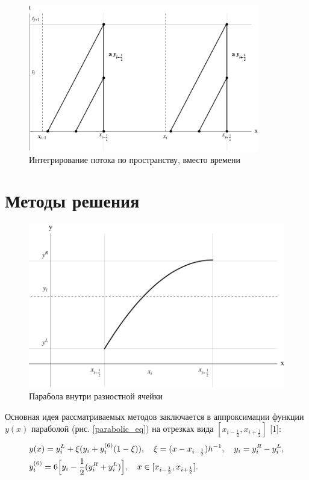 \documentclass[12pt,a4paper]{article}
\newcommand{\picref}[1]{рис. \ref{#1}}
\newcommand{\half}{\frac{1}{2}}
\begin{document}
    \begin{figure}[h]
        \centering
        \includegraphics[width=0.897\textwidth]{flow_visual.pdf}
        \caption{Интегрирование потока по пространству, вместо времени}
        \label{fig:flow_visual}
    \end{figure}

    \section{Методы решения}
    \begin{figure}[h]
        \centering
        \includegraphics[width=\textwidth]{ppm_visual.pdf}
        \caption{Парабола внутри разностной ячейки}
        \label{fig:ppm_visual}
    \end{figure}

    Основная идея рассматриваемых методов заключается в аппроксимации функции $y(x)$ параболой (\picref{parabolic_eq}) на отрезках вида $ [x_{i-\half}, x_{i+\half}] $ [1]:
    \begin{equation}
    \begin{split}
        \label{parabolic_eq}
        &y(x) = y_i^L + \xi(\Delta y_i + y_i^{(6)}(1 - \xi)), \quad \xi = (x - x_{i-\half})h^{-1}, \quad  \Delta y_i = y_i^R-y_i^L, \\
        &y_i^{(6)} = 6\Bigl[ y_i - \half(y_i^R + y_i^L)\Bigr], \quad x \in [x_{i-\half}, x_{i + \half}].
    \end{split}
    \end{equation}
\end{document}
